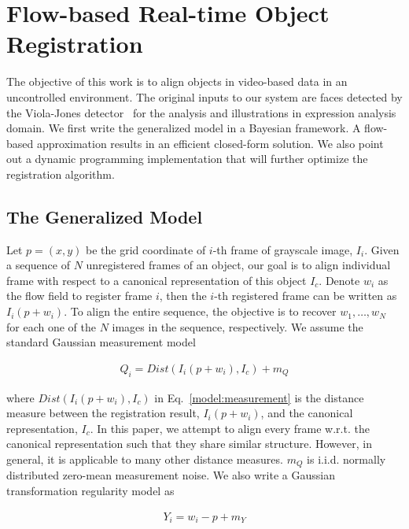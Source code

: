 \documentclass[10pt,journal]{IEEEtran}
\begin{document}
\section{\label{sec:approach}Flow-based Real-time Object Registration}

The objective of this work is to align objects in video-based data in an uncontrolled environment. The original inputs to our system are faces detected by the Viola-Jones detector~\cite{Viola_IJCV04} for the analysis and illustrations in expression analysis domain. We first write the generalized model in a Bayesian framework. A flow-based approximation results in an efficient closed-form solution. We also point out a dynamic programming implementation that will further optimize the registration algorithm.

\subsection{\label{sec:model}The Generalized Model}

Let $p=(x,y)$ be the grid coordinate of $i$-th frame of grayscale image, $I_i$. Given a sequence of $N$ unregistered frames of an object, our goal is to align individual frame with respect to a canonical representation of this object $I_c$. \textcolor[rgb]{1,0,0}{Denote $w_i$ as the flow field to register frame $i$, then the $i$-th registered frame can be written as $I_i(p+w_i)$. To align the entire sequence, the objective is to recover $w_1,\ldots,w_N$ for each one of the $N$ images in the sequence, respectively. We assume the standard Gaussian measurement} model

\begin{align}
\label{model:measurement}
Q_i=Dist(I_i(p+w_i),I_c)+m_Q
\end{align}

\noindent \textcolor[rgb]{1,0,0}{where $Dist(I_i(p+w_i),I_c)$ in Eq.~\ref{model:measurement} is the distance measure between the registration result, $I_i(p+w_i)$, and the canonical representation, $I_c$.} In this paper, we attempt to align every frame w.r.t. the canonical representation such that they share similar structure. However, in general, it is applicable to many other distance measures. $m_Q$ is i.i.d. normally distributed zero-mean measurement noise. We also write a Gaussian transformation regularity model as

\begin{align}
\label{model:penalty}
Y_i=w_i-p+m_Y
\end{align}
\end{document}
